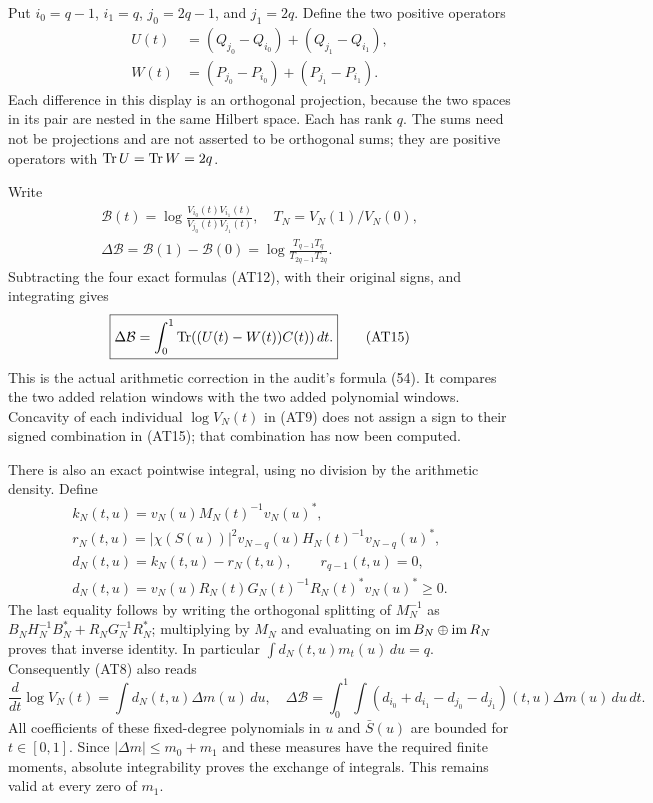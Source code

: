 Put $i_0=q-1$, $i_1=q$, $j_0=2q-1$, and $j_1=2q$.
Define the two positive operators
\[
 \begin{split}
 U(t)&=(Q_{j_0}-Q_{i_0})+(Q_{j_1}-Q_{i_1}),\\
 W(t)&=(P_{j_0}-P_{i_0})+(P_{j_1}-P_{i_1}).    \end{split}
 \tag{AT13}
\]
Each difference in this display is an orthogonal projection,
because the two spaces in its pair are nested in the same
Hilbert space. Each has rank $q$. The sums need not be
projections and are not asserted to be orthogonal sums; they
are positive operators with $\operatorname{Tr} U=\operatorname{Tr} W=2q$.

Write
\[
 \begin{gathered}
 \mathcal B(t)=\log\frac{V_{i_0}(t)V_{i_1}(t)}{V_{j_0}(t)V_{j_1}(t)},
 \quad T_N=V_N(1)/V_N(0),\\
 \Delta\mathcal B=\mathcal B(1)-\mathcal B(0)
 =\log\frac{T_{q-1}T_q}{T_{2q-1}T_{2q}}.       \end{gathered}
 \tag{AT14}
\]
Subtracting the four exact formulas (AT12), with their original
signs, and integrating gives
\[
 \boxed{\displaystyle
 \Delta\mathcal B=\int_0^1\operatorname{Tr}((U(t)-W(t))C(t))\,dt .}
                                                        \tag{AT15}
\]
This is the actual arithmetic correction in the audit's formula
(54). It compares the two added relation windows with the two
added polynomial windows. Concavity of each individual
$\log V_N(t)$ in (AT9) does not assign a sign to their signed
combination in (AT15); that combination has now been computed.

There is also an exact pointwise integral, using no division by
the arithmetic density. Define
\[
 \begin{gathered}
 k_N(t,u)=v_N(u)M_N(t)^{-1}v_N(u)^*,\\
 r_N(t,u)=|\chi(S(u))|^2
 v_{N-q}(u)H_N(t)^{-1}v_{N-q}(u)^*,\\
 d_N(t,u)=k_N(t,u)-r_N(t,u),\qquad r_{q-1}(t,u)=0,\\
 d_N(t,u)=v_N(u)R_N(t)G_N(t)^{-1}R_N(t)^*v_N(u)^*\ge0.
                                                        \end{gathered}
 \tag{AT16}
\]
The last equality follows by writing the orthogonal splitting
of $M_N^{-1}$ as
$B_NH_N^{-1}B_N^*+R_NG_N^{-1}R_N^*$; multiplying by $M_N$
and evaluating on $\operatorname{im} B_N\oplus\operatorname{im} R_N$ proves that inverse
identity. In particular $\int d_N(t,u)m_t(u)\,du=q$.
Consequently (AT8) also reads
\[
 \frac{d}{dt}\log V_N(t)=\int d_N(t,u)\Delta m(u)\,du,
\quad
 \Delta\mathcal B=\int_0^1\int
 (d_{i_0}+d_{i_1}-d_{j_0}-d_{j_1})(t,u)\Delta m(u)\,du\,dt.
                                                        \tag{AT17}
\]
All coefficients of these fixed-degree polynomials in $u$ and
$\bar S(u)$ are bounded for $t\in[0,1]$. Since
$|\Delta m|\le m_0+m_1$ and these measures have the required
finite moments, absolute integrability proves the exchange of
integrals. This remains valid at every zero of $m_1$.

